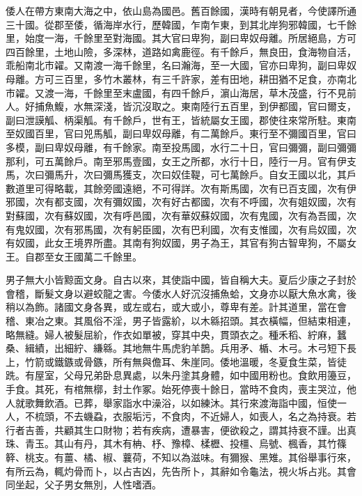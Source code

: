
\begin{pinyinscope}
倭人在帶方東南大海之中，依山島為國邑。舊百餘國，漢時有朝見者，今使譯所通三十國。從郡至倭，循海岸水行，歷韓國，乍南乍東，到其北岸狗邪韓國，七千餘里，始度一海，千餘里至對海國。其大官曰卑狗，副曰卑奴母離。所居絕島，方可四百餘里，土地山險，多深林，道路如禽鹿徑。有千餘戶，無良田，食海物自活，乖船南北巿糴。又南渡一海千餘里，名曰瀚海，至一大國，官亦曰卑狗，副曰卑奴母離。方可三百里，多竹木叢林，有三千許家，差有田地，耕田猶不足食，亦南北巿糴。又渡一海，千餘里至末盧國，有四千餘戶，濵山海居，草木茂盛，行不見前人。好捕魚鰒，水無深淺，皆沉沒取之。東南陸行五百里，到伊都國，官曰爾支，副曰泄謨觚、柄渠觚。有千餘戶，世有王，皆統屬女王國，郡使往來常所駐。東南至奴國百里，官曰兕馬觚，副曰卑奴母離，有二萬餘戶。東行至不彌國百里，官曰多模，副曰卑奴母離，有千餘家。南至投馬國，水行二十日，官曰彌彌，副曰彌彌那利，可五萬餘戶。南至邪馬壹國，女王之所都，水行十日，陸行一月。官有伊支馬，次曰彌馬升，次曰彌馬獲支，次曰奴佳鞮，可七萬餘戶。自女王國以北，其戶數道里可得略載，其餘旁國遠絕，不可得詳。次有斯馬國，次有已百支國，次有伊邪國，次有都支國，次有彌奴國，次有好古都國，次有不呼國，次有姐奴國，次有對蘇國，次有蘇奴國，次有呼邑國，次有華奴蘇奴國，次有鬼國，次有為吾國，次有鬼奴國，次有邪馬國，次有躬臣國，次有巴利國，次有支惟國，次有烏奴國，次有奴國，此女王境界所盡。其南有狗奴國，男子為王，其官有狗古智卑狗，不屬女王。自郡至女王國萬二千餘里。

男子無大小皆黥面文身。自古以來，其使詣中國，皆自稱大夫。夏后少康之子封於會稽，斷髮文身以避蛟龍之害。今倭水人好沉沒捕魚蛤，文身亦以厭大魚水禽，後稍以為飾。諸國文身各異，或左或右，或大或小，尊卑有差。計其道里，當在會稽、東冶之東。其風俗不淫，男子皆露紒，以木緜招頭。其衣橫幅，但結束相連，略無縫。婦人被髮屈紒，作衣如單被，穿其中央，貫頭衣之。種禾稻、紵麻，蠶桑、緝績，出細紵、縑緜。其地無牛馬虎豹羊鵲。兵用矛、楯、木弓。木弓短下長上，竹箭或鐵鏃或骨鏃，所有無與儋耳、朱崖同。倭地溫暖，冬夏食生菜，皆徒跣。有屋室，父母兄弟卧息異處，以朱丹塗其身體，如中國用粉也。食飲用籩豆，手食。其死，有棺無槨，封土作冢。始死停喪十餘日，當時不食肉，喪主哭泣，他人就歌舞飲酒。已葬，舉家詣水中澡浴，以如練沐。其行來渡海詣中國，恒使一人，不梳頭，不去蟣蝨，衣服垢污，不食肉，不近婦人，如喪人，名之為持衰。若行者吉善，共顧其生口財物；若有疾病，遭暴害，便欲殺之，謂其持衰不謹。出真珠、青玉。其山有丹，其木有柟、杼、豫樟、楺櫪、投橿、烏號、楓香，其竹篠簳、桃支。有薑、橘、椒、蘘荷，不知以為滋味。有獮猴、黑雉。其俗舉事行來，有所云為，輒灼骨而卜，以占吉凶，先告所卜，其辭如令龜法，視火坼占兆。其會同坐起，父子男女無別，人性嗜酒。


\end{pinyinscope}
